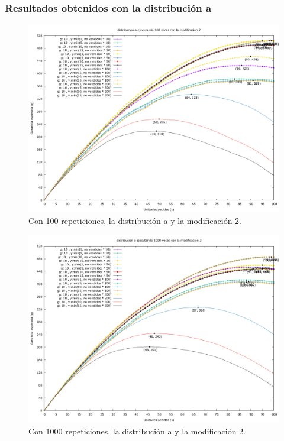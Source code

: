 \documentclass[12pt, spanish]{article}
\begin{document}
\subsubsection{Resultados obtenidos con la distribución a}


\begin{figure}[H]
	\centering
	\includegraphics[scale = 0.2]{prob_a/datos_a_100_2.png}
	\caption{Con 100 repeticiones, la distribución a y la modificación 2.}
	\label{fig:ej1_a_100}

\end{figure}

\begin{figure}[H]
	\centering
	\includegraphics[scale = 0.2]{prob_a/datos_a_1000_2.png}
	\caption{Con 1000 repeticiones, la distribución a y la modificación 2.}
	\label{fig:ej1_a_1000}

\end{figure}
\end{document}
